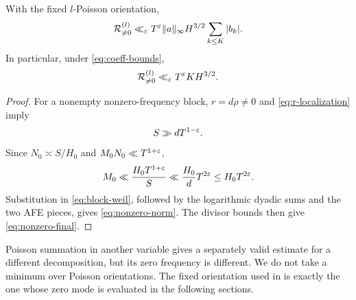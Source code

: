 \begin{proposition}
\label{prop:nonzero-global}
With the fixed $l$-Poisson orientation,
\begin{equation}\label{eq:nonzero-norm}
 \mathcal R_{\neq0}^{(l)}
 \ll_\varepsilon T^\varepsilon\lVert a\rVert_\infty H^{3/2}
                    \sum_{k\leq K}|b_k|.
\end{equation}
In particular, under \eqref{eq:coeff-bounds},
\begin{equation}\label{eq:nonzero-final}
                       \mathcal R_{\neq0}^{(l)}
                       \ll_\varepsilon T^\varepsilon KH^{3/2}.
\end{equation}
\end{proposition}

\begin{proof}
For a nonempty nonzero-frequency block, $r=d\rho\neq0$ and
\eqref{eq:r-localization} imply
\begin{equation}\label{eq:nonempty-S}
                          S\gg dT^{1-\varepsilon}.
\end{equation}
Since $N_0\asymp S/H_0$ and $M_0N_0\ll T^{1+\varepsilon}$,
\begin{equation}\label{eq:M-less-H}
 M_0\ll\frac{H_0T^{1+\varepsilon}}S
      \ll\frac{H_0}{d}T^{2\varepsilon}\leq H_0T^{2\varepsilon}.
\end{equation}
Substitution in \eqref{eq:block-weil}, followed by the logarithmic dyadic
sums and the two AFE pieces, gives \eqref{eq:nonzero-norm}.  The divisor
bounds then give \eqref{eq:nonzero-final}.
\end{proof}

\begin{remark}\label{rem:no-minimum}
Poisson summation in another variable gives a separately valid estimate for
a different decomposition, but its zero frequency is different.  We do not
take a minimum over Poisson orientations.  The fixed orientation used in
 is exactly the one whose zero mode is evaluated in
the following sections.
\end{remark}
